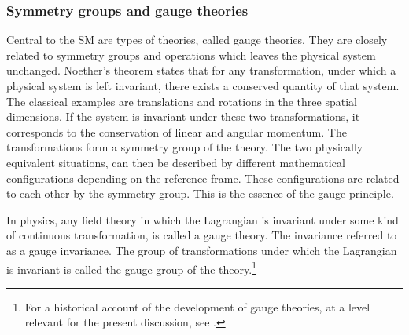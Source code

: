 \subsubsection{Symmetry groups and gauge theories}
Central to the SM are types of theories, called gauge theories. They are closely related to symmetry groups and operations which leaves the physical system unchanged. Noether's theorem \cite{noether1971ivp} states that for any transformation, under which a physical system is left invariant, there exists a conserved quantity of that system. The classical examples are translations and rotations in the three spatial dimensions. If the system is invariant under these two transformations, it corresponds to the conservation of linear and angular momentum. The transformations form a symmetry group of the theory. The two physically equivalent situations, can then be described by different mathematical configurations depending on the reference frame. These configurations are related to each other by the symmetry group. This is the essence of the gauge principle.

In physics, any field theory in which the Lagrangian is invariant under some kind of continuous transformation, is called a gauge theory. The invariance referred to as a gauge invariance. The group of transformations under which the Lagrangian is invariant is called the gauge group of the theory.\footnote{For a historical account of the development of gauge theories, at a level relevant for the present discussion, see \cite{gross1992gtp}.}

